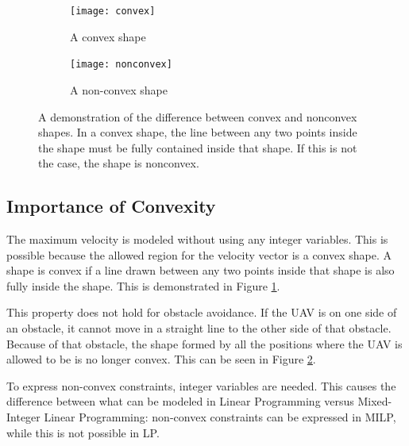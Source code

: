 \begin{figure}[h]
    \centering
    
    \begin{subfigure}[]{0.25\textwidth}
        \texttt{[image: convex]}
        \caption{A convex shape}
        \label{fig:convex-example}
    \end{subfigure}
    \hfil
    \begin{subfigure}[]{0.25\textwidth}
        \texttt{[image: nonconvex]}
        \caption{A non-convex shape}
        \label{fig:nonconvex-example}
    \end{subfigure}
    \caption[A demonstration of the difference between a convex and nonconvex shape]{A demonstration of the difference between convex and nonconvex shapes. In a convex shape, the line between any two points inside the shape must be fully contained inside that shape. If this is not the case, the shape is nonconvex.}\label{fig:convexity-example}
\end{figure}

\subsection{Importance of Convexity}
The maximum velocity is modeled without using any integer variables. This is possible because the allowed region for the velocity vector is a convex shape. A shape is convex if a line drawn between any two points inside that shape is also fully inside the shape. This is demonstrated in Figure \ref{fig:convex-example}.
\par
This property does not hold for obstacle avoidance. If the UAV is on one side of an obstacle, it cannot move in a straight line to the other side of that obstacle. Because of that obstacle, the shape formed by all the positions where the UAV is allowed to be is no longer convex. This can be seen in Figure \ref{fig:nonconvex-example}.
\par
To express non-convex constraints, integer variables are needed. This causes the difference between what can be modeled in Linear Programming versus Mixed-Integer Linear Programming: non-convex constraints can be expressed in MILP, while this is not possible in LP.



